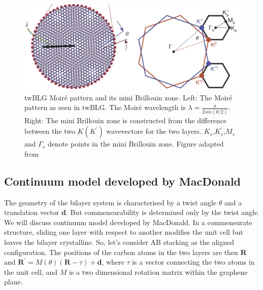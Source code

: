 \begin{figure}[H]
	\centering
	\includegraphics[width=\textwidth]{figures/twblg_lattice.jpg}
	\caption{twBLG Moiré pattern and its mini Brillouin zone. Left:  The Moiré pattern as seen in twBLG. The Moiré wavelength is $\lambda=\frac{a}{2sin(\theta/2)}$. Right: The mini Brillouin zone is constructed from the difference between the two $K(K^\prime)$ wavevectors for the two layers. $K_s$,$K_s^\prime$,$M_s$ and $\Gamma_s$ denote points in the mini Brillouin zone. Figure adapted from \cite{Cao2018}}
	\label{fig:twblg_lattice}
\end{figure}

\subsection{Continuum model developed by MacDonald}
The geometry of the bilayer system is characterised by a twist angle $\theta$ and a translation vector $\mathbf{d}$. But commensurability is determined only by the twist angle. We will discuss continuum model developed by MacDonald. \cite{Bistritzer12233} In a commensurate structure, sliding one layer with respect to another modifies the unit cell but leaves the bilayer crystalline. So, let's consider AB stacking as the aligned configuration. The positions of the carbon atoms in the two layers are then $\mathbf{R}$ and $\mathbf{R^{\prime}} = M(\theta)(\mathbf{R}-\tau)+\mathbf{d}$, where $\tau$ is a vector connecting the two atoms in the unit cell, and $M$ is a two dimensional rotation matrix within the graphene plane.


